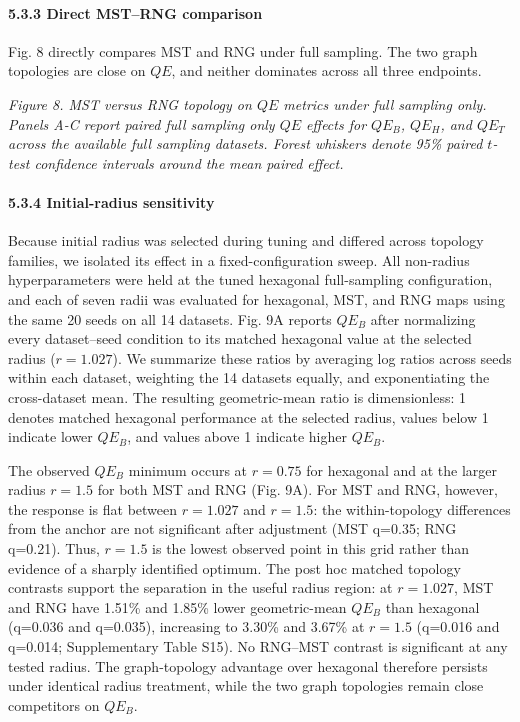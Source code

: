 \documentclass[
]{article}
\makeatletter
\newcommand*\pandocbounded[1]{%
  \sbox\pandoc@box{#1}%
  \Gscale@div\@tempa{\textheight}{\dimexpr\ht\pandoc@box+\dp\pandoc@box\relax}%
  \Gscale@div\@tempb{\linewidth}{\wd\pandoc@box}%
  \ifdim\@tempb\p@<\@tempa\p@\let\@tempa\@tempb\fi%
  \ifdim\@tempa\p@<\p@\scalebox{\@tempa}{\usebox\pandoc@box}%
  \else\usebox{\pandoc@box}%
  \fi%
}
\providecommand{\DIFadd}[1]{{\protect\color{blue} #1}} %
\providecommand{\DIFaddbegin}{} %
\makeatother
\begin{document}
\DIFaddbegin \paragraph{\DIFadd{5.3.3 Direct MST--RNG
comparison}}\label{direct-mstrng-comparison}

\DIFadd{Fig. 8 directly compares MST and RNG under full sampling. The two graph
topologies are close on \(QE\), and neither dominates across all three
endpoints.
}

\pandocbounded{}
\DIFadd{\emph{Figure 8. MST versus RNG topology on \(QE\) metrics under full
sampling only. Panels A-C report paired full sampling only \(QE\)
effects for \(QE_B\), \(QE_H\), and \(QE_T\) across the available full
sampling datasets. Forest whiskers denote 95\% paired \(t\)-test
confidence intervals around the mean paired effect.}
}

\paragraph{\DIFadd{5.3.4 Initial-radius
sensitivity}}\label{initial-radius-sensitivity}

\DIFadd{Because initial radius was selected during tuning and differed across
topology families, we isolated its effect in a fixed-configuration
sweep. All non-radius hyperparameters were held at the tuned hexagonal
full-sampling configuration, and each of seven radii was evaluated for
hexagonal, MST, and RNG maps using the same 20 seeds on all 14 datasets.
Fig. 9A reports \(QE_B\) after normalizing every dataset--seed condition
to its matched hexagonal value at the selected radius (\(r=1.027\)). We
summarize these ratios by averaging log ratios across seeds within each
dataset, weighting the 14 datasets equally, and exponentiating the
cross-dataset mean. The resulting geometric-mean ratio is dimensionless:
1 denotes matched hexagonal performance at the selected radius, values
below 1 indicate lower \(QE_B\), and values above 1 indicate higher
\(QE_B\).
}

\DIFadd{The observed \(QE_B\) minimum occurs at \(r=0.75\) for hexagonal and at
the larger radius \(r=1.5\) for both MST and RNG (Fig. 9A). For MST and
RNG, however, the response is flat between \(r=1.027\) and \(r=1.5\):
the within-topology differences from the anchor are not significant
after adjustment (MST q=0.35; RNG q=0.21). Thus, \(r=1.5\) is the lowest
observed point in this grid rather than evidence of a sharply identified
optimum. The post hoc matched topology contrasts support the separation
in the useful radius region: at \(r=1.027\), MST and RNG have 1.51\% and
1.85\% lower geometric-mean \(QE_B\) than hexagonal (q=0.036 and
q=0.035), increasing to 3.30\% and 3.67\% at \(r=1.5\) (q=0.016 and
q=0.014; Supplementary Table S15). No RNG--MST contrast is significant
at any tested radius. The graph-topology advantage over hexagonal
therefore persists under identical radius treatment, while the two graph
topologies remain close competitors on \(QE_B\).
}
\end{document}
